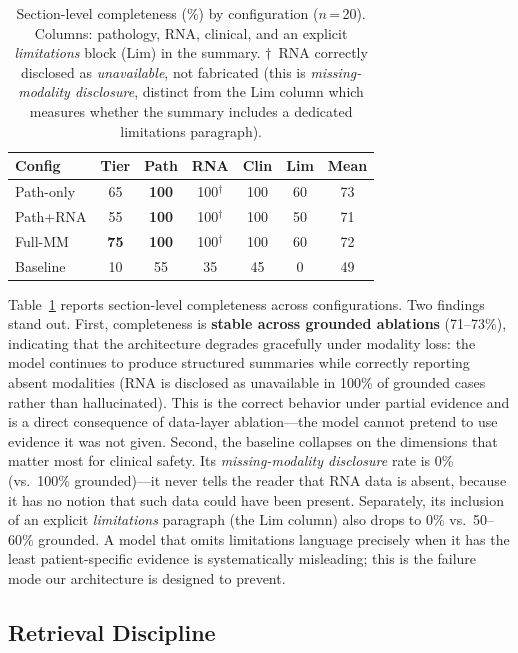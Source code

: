 \documentclass[11pt]{article}
\begin{document}
\begin{table}[h]
\centering
\small
\setlength{\tabcolsep}{3pt}
\begin{tabular}{lcccccc}
\toprule
\textbf{Config} & \textbf{Tier} & \textbf{Path} & \textbf{RNA} & \textbf{Clin} & \textbf{Lim} & \textbf{Mean} \\
\midrule
Path-only & 65 & \textbf{100} & 100$^\dagger$ & 100 & 60 & 73 \\
Path+RNA  & 55 & \textbf{100} & 100$^\dagger$ & 100 & 50 & 71 \\
Full-MM   & \textbf{75} & \textbf{100} & 100$^\dagger$ & 100 & 60 & 72 \\
\midrule
Baseline  & 10 & 55  & 35  & 45  & 0  & 49 \\
\bottomrule
\end{tabular}
\caption{Section-level completeness (\%) by configuration ($n$\,=\,20). Columns: pathology, RNA, clinical, and an explicit \emph{limitations} block (Lim) in the summary. $\dagger$~RNA correctly disclosed as \emph{unavailable}, not fabricated (this is \emph{missing-modality disclosure}, distinct from the Lim column which measures whether the summary includes a dedicated limitations paragraph).}
\label{tab:ablation}
\end{table}

Table~\ref{tab:ablation} reports section-level completeness across configurations. Two findings stand out. First, completeness is \textbf{stable across grounded ablations} (71--73\%), indicating that the architecture degrades gracefully under modality loss: the model continues to produce structured summaries while correctly reporting absent modalities (RNA is disclosed as unavailable in 100\% of grounded cases rather than hallucinated). This is the correct behavior under partial evidence and is a direct consequence of data-layer ablation—the model cannot pretend to use evidence it was not given. Second, the baseline collapses on the dimensions that matter most for clinical safety. Its \emph{missing-modality disclosure} rate is 0\% (vs.\ 100\% grounded)—it never tells the reader that RNA data is absent, because it has no notion that such data could have been present. Separately, its inclusion of an explicit \emph{limitations} paragraph (the Lim column) also drops to 0\% vs.\ 50--60\% grounded. A model that omits limitations language precisely when it has the least patient-specific evidence is systematically misleading; this is the failure mode our architecture is designed to prevent.

\subsection{Retrieval Discipline}
\end{document}
